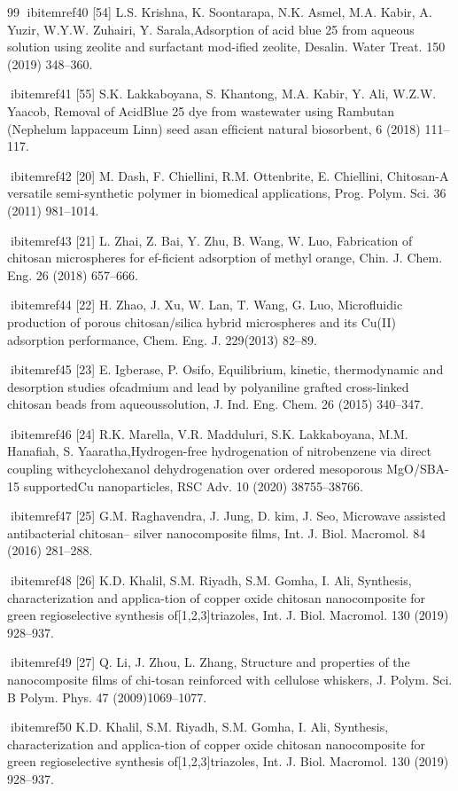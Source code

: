 \documentclass[final,5p,times,twocolumn,authoryear]{elsarticle}
\begin{document}
\begin{thebibliography}{99}
ibitem{ref40} [54] L.S. Krishna, K. Soontarapa, N.K. Asmel, M.A. Kabir, A. Yuzir, W.Y.W. Zuhairi, Y. Sarala,Adsorption of acid blue 25 from aqueous solution using zeolite and surfactant mod-iﬁed zeolite, Desalin. Water Treat. 150 (2019) 348–360.

ibitem{ref41} [55] S.K. Lakkaboyana, S. Khantong, M.A. Kabir, Y. Ali, W.Z.W. Yaacob, Removal of AcidBlue 25 dye from wastewater using Rambutan (Nephelum lappaceum Linn) seed asan efﬁcient natural biosorbent, 6 (2018) 111–117.

ibitem{ref42} [20] M. Dash, F. Chiellini, R.M. Ottenbrite, E. Chiellini, Chitosan-A versatile semi-synthetic polymer in biomedical applications, Prog. Polym. Sci. 36 (2011) 981–1014.

ibitem{ref43} [21] L. Zhai, Z. Bai, Y. Zhu, B. Wang, W. Luo, Fabrication of chitosan microspheres for ef-ﬁcient adsorption of methyl orange, Chin. J. Chem. Eng. 26 (2018) 657–666.

ibitem{ref44} [22] H. Zhao, J. Xu, W. Lan, T. Wang, G. Luo, Microﬂuidic production of porous chitosan/silica hybrid microspheres and its Cu(II) adsorption performance, Chem. Eng. J. 229(2013) 82–89.

ibitem{ref45} [23] E. Igberase, P. Osifo, Equilibrium, kinetic, thermodynamic and desorption studies ofcadmium and lead by polyaniline grafted cross-linked chitosan beads from aqueoussolution, J. Ind. Eng. Chem. 26 (2015) 340–347.

ibitem{ref46} [24] R.K. Marella, V.R. Madduluri, S.K. Lakkaboyana, M.M. Hanaﬁah, S. Yaaratha,Hydrogen-free hydrogenation of nitrobenzene via direct coupling withcyclohexanol dehydrogenation over ordered mesoporous MgO/SBA-15 supportedCu nanoparticles, RSC Adv. 10 (2020) 38755–38766.

ibitem{ref47} [25] G.M. Raghavendra, J. Jung, D. kim, J. Seo, Microwave assisted antibacterial chitosan– silver nanocomposite ﬁlms, Int. J. Biol. Macromol. 84 (2016) 281–288.

ibitem{ref48} [26] K.D. Khalil, S.M. Riyadh, S.M. Gomha, I. Ali, Synthesis, characterization and applica-tion of copper oxide chitosan nanocomposite for green regioselective synthesis of[1,2,3]triazoles, Int. J. Biol. Macromol. 130 (2019) 928–937.

ibitem{ref49} [27] Q. Li, J. Zhou, L. Zhang, Structure and properties of the nanocomposite ﬁlms of chi-tosan reinforced with cellulose whiskers, J. Polym. Sci. B Polym. Phys. 47 (2009)1069–1077.

ibitem{ref50} K.D. Khalil, S.M. Riyadh, S.M. Gomha, I. Ali, Synthesis, characterization and applica-tion of copper oxide chitosan nanocomposite for green regioselective synthesis of[1,2,3]triazoles, Int. J. Biol. Macromol. 130 (2019) 928–937.


\end{thebibliography}
\end{document}
